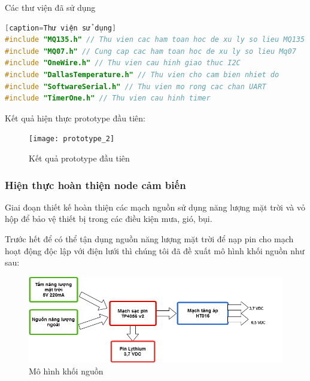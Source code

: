 Các thư viện đã sử dụng
\begin{lstlisting}[language=C][caption=Thư viện sử dụng]
#include "MQ135.h" // Thu vien cac ham toan hoc de xu ly so lieu MQ135
#include "MQ07.h" // Cung cap cac ham toan hoc de xu ly so lieu Mq07
#include "OneWire.h" // Thu vien cau hinh giao thuc I2C
#include "DallasTemperature.h" // Thu vien cho cam bien nhiet do
#include "SoftwareSerial.h" // Thu vien mo rong cac chan UART
#include "TimerOne.h" // Thu vien cau hinh timer
\end{lstlisting}

Kết quả hiện thực prototype đầu tiên:
\begin{figure}[H]
\centering    
\texttt{[image: prototype\_2]}
\caption[Kết quả prototype đầu tiên]{Kết quả prototype đầu tiên}
\label{fig:prototype_2}
\end{figure}


\subsubsection*{Hiện thực hoàn thiện node cảm biến}
Giai đoạn thiết kế hoàn thiện các mạch nguồn sử dụng năng lượng mặt trời và vỏ hộp để bảo vệ thiết bị trong các điều kiện mưa, gió, bụi.

Trước hết để có thể tận dụng nguồn năng lượng mặt trời để nạp pin cho mạch hoạt động độc lập với điện lưới thì chúng tôi đã đề xuất mô hình khối nguồn như sau:
\begin{figure}[H]
\centering    
\includegraphics[width=6in]{khoinguon}
\caption[Mô hình khối nguồn]{Mô hình khối nguồn}
\label{fig:khoinguon}
\end{figure}

